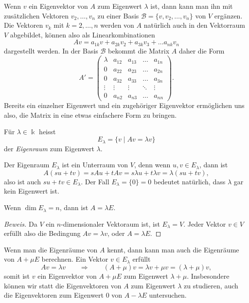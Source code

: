 Wenn $v$ ein Eigenvektor von $A$ zum Eigenwert $\lambda$ ist, dann kann
man ihn mit zusätzlichen Vektoren $v_2,\dots,v_n$ zu einer Basis
$\mathcal{B}=\{v,v_2,\dots,v_n\}$
von $V$ ergänzen.
Die Vektoren $v_k$ mit $k=2,\dots,n$ werden von $A$ natürlich auch
in den Vektorraum $V$ abgebildet, können also als Linearkombinationen
\[
Av = a_{1k}v + a_{2k}v_2 + a_{3k}v_3 + \dots a_{nk}v_n
\]
dargestellt werden.
In der Basis $\mathcal{B}$ bekommt die Matrix $A$ daher die Form
\[
A'
=
\begin{pmatrix}
\lambda&a_{12}&a_{13}&\dots &a_{1n}\\
    0  &a_{22}&a_{23}&\dots &a_{2n}\\
    0  &a_{32}&a_{33}&\dots &a_{3n}\\
\vdots &\vdots&\vdots&\ddots&\vdots\\
    0  &a_{n2}&a_{n3}&\dots &a_{nn}
\end{pmatrix}.
\]
Bereits ein einzelner Eigenwert und ein zugehöriger Eigenvektor
ermöglichen uns also, die Matrix in eine etwas einfachere Form
zu bringen.

\begin{definition}
Für $\lambda\in\Bbbk$ heisst
\[
E_\lambda
=
\{ v\;|\; Av=\lambda v\}
\]
der {\em Eigenraum} zum Eigenwert $\lambda$.
%
\end{definition}

Der Eigenraum $E_\lambda$ ist ein Unterraum von $V$, denn wenn
$u,v\in E_\lambda$, dann ist
\[
A(su+tv)
=
sAu+tAv
=
s\lambda u + t\lambda v
=
\lambda(su+tv),
\]
also ist auch $su+tv\in E_\lambda$.
Der Fall $E_\lambda = \{0\}=0$ bedeutet natürlich, dass $\lambda$ gar kein
Eigenwert ist.

\begin{satz}
Wenn $\dim E_\lambda=n$, dann ist $A=\lambda E$.
\end{satz}

\begin{proof}[Beweis]
Da $V$ ein $n$-dimensionaler Vektoraum ist, ist $E_\lambda=V$.
Jeder Vektor $v\in V$ erfüllt also die Bedingung $Av=\lambda v$,
oder $A=\lambda E$.
\end{proof}

Wenn man die Eigenräume von $A$ kennt, dann kann man auch die Eigenräume
von $A+\mu E$ berechnen.
Ein Vektor $v\in E_\lambda$ erfüllt
\[
Av=\lambda v
\qquad\Rightarrow\qquad
(A+\mu)v = \lambda v + \mu v
=
(\lambda+\mu)v,
\]
somit ist $v$ ein Eigenvektor von $A+\mu E$ zum Eigenwert $\lambda+\mu$.
Insbesondere können wir statt die Eigenvektoren von $A$ zum Eigenwert $\lambda$
zu studieren, auch die Eigenvektoren zum Eigenwert $0$ von $A-\lambda E$
untersuchen.

